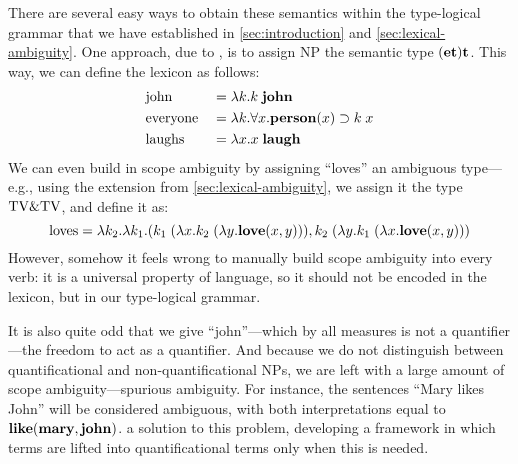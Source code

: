 There are several easy ways to obtain these semantics within the
type-logical grammar that we have established in
\autoref{sec:introduction} and \autoref{sec:lexical-ambiguity}.
One approach, due to \citet{montague1973}, is to assign NP the
semantic type $(\mathbf{e}\mathbf{t})\mathbf{t}$. This way, we can define the lexicon as
follows:
\begin{alignat*}{3}
  &\text{john}     &&= \lambda k. k\;\mathbf{john}                          \\
  &\text{everyone} &&= \lambda k. \forall x. \mathbf{person}(x)\supset k\;x \\
  &\text{laughs}   &&= \lambda x. x\;\mathbf{laugh}
\end{alignat*}
We can even build in scope ambiguity by assigning ``loves'' an
  ambiguous type---e.g., using the extension from
  \autoref{sec:lexical-ambiguity}, we assign it the type $\text{TV}\&\text{TV}$,
  and define it as:
\[
  \text{loves} = \lambda k_2. \lambda k_1.
  (k_1\;(\lambda x.k_2\;(\lambda y.\mathbf{love}(x,y))), k_2\;(\lambda y.k_1\;(\lambda x.\mathbf{love}(x,y)))
\]
However, somehow it feels wrong to manually build scope ambiguity into
every verb: it is a universal property of language, so it should not
be encoded in the lexicon, but in our type-logical grammar.

It is also quite odd that we give ``john''---which by all measures is
not a quantifier---the freedom to act as a quantifier. And because we
do not distinguish between quantificational and non-quantificational
NPs, we are left with a large amount of scope ambiguity---spurious
ambiguity. For instance, the sentences ``Mary likes John'' will be
considered ambiguous, with both interpretations equal to $\mathbf{like}(\mathbf{mary},
\mathbf{john})$. \citet{hendriks1993} a solution to this problem, developing a
framework in which terms are lifted into quantificational terms only
when this is needed.


\vspace*{1\baselineskip}

